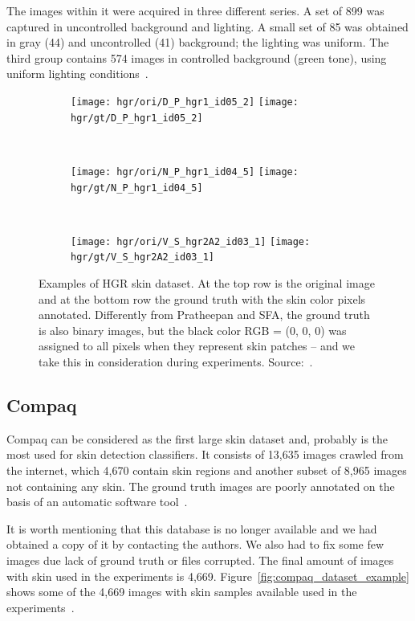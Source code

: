 The images within it were acquired in three different series. A set of 899 was captured in uncontrolled background and lighting. A small set of 85 was obtained in gray (44) and uncontrolled (41) background; the lighting was uniform. The third group contains 574 images in controlled background (green tone), using uniform lighting conditions~\citep{kawulok:14, nalepa:14, grzejszczak:16}.

\begin{figure}[H]
    \centering
    \begin{subfigure}[t]{0.3\textwidth}
        \texttt{[image: hgr/ori/D\_P\_hgr1\_id05\_2]}
        \texttt{[image: hgr/gt/D\_P\_hgr1\_id05\_2]}
    \end{subfigure}
    ~
    \begin{subfigure}[t]{0.275\textwidth}
        \texttt{[image: hgr/ori/N\_P\_hgr1\_id04\_5]}
        \texttt{[image: hgr/gt/N\_P\_hgr1\_id04\_5]}
    \end{subfigure}
    ~
    \begin{subfigure}[t]{0.337\textwidth}
        \texttt{[image: hgr/ori/V\_S\_hgr2A2\_id03\_1]}
        \texttt{[image: hgr/gt/V\_S\_hgr2A2\_id03\_1]}
    \end{subfigure}
    \caption[Examples of HGR skin dataset]{Examples of HGR skin dataset. At the top row is the original image and at the bottom row the ground truth with the skin color pixels annotated. Differently from Pratheepan and SFA, the ground truth is also binary images, but the black color RGB = (0, 0, 0) was assigned to all pixels when they represent skin patches -- and we take this in consideration during experiments. Source:~\citet{kawulok:14, nalepa:14, grzejszczak:16}.}
    \label{fig:hgr_dataset_exemplo}
\end{figure}


\subsection{Compaq}
\label{sec:datasets_compaq}
Compaq can be considered as the first large skin dataset and, probably is the most used for skin detection classifiers. It consists of 13,635 images crawled from the internet, which 4,670 contain skin regions and another subset of 8,965 images not containing any skin. The ground truth images are poorly annotated on the basis of an automatic software tool~\citep{mahmoodi:16}.

It is worth mentioning that this database is no longer available and we had obtained a copy of it by contacting the authors. We also had to fix some few images due lack of ground truth or files corrupted. The final amount of images with skin used in the experiments is 4,669. Figure~\ref{fig:compaq_dataset_example} shows some of the 4,669 images with skin samples available used in the experiments~\citep{jones:02}.

